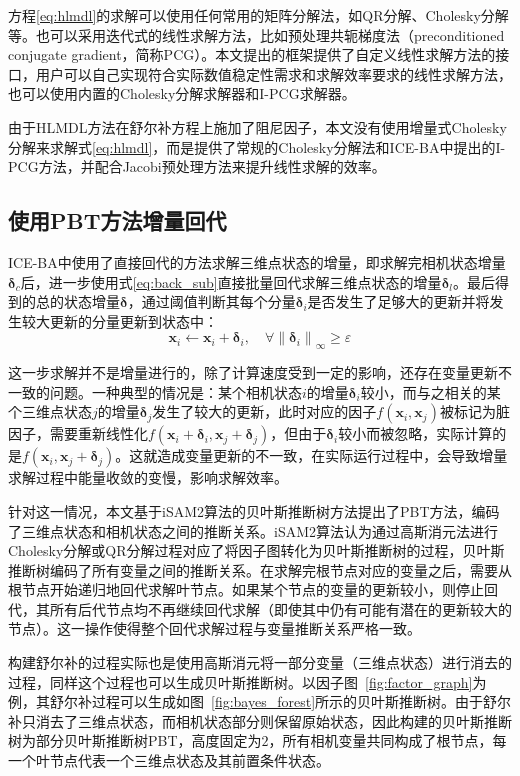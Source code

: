 方程\eqref{eq:hlmdl}的求解可以使用任何常用的矩阵分解法，如QR分解、Cholesky分解等。也可以采用迭代式的线性求解方法，比如预处理共轭梯度法（preconditioned conjugate gradient，简称PCG）。本文提出的框架提供了自定义线性求解方法的接口，用户可以自己实现符合实际数值稳定性需求和求解效率要求的线性求解方法，也可以使用内置的Cholesky分解求解器和I-PCG求解器。

由于HLMDL方法在舒尔补方程上施加了阻尼因子，本文没有使用增量式Cholesky分解\citep{polok2013incremental}来求解式\eqref{eq:hlmdl}，而是提供了常规的Cholesky分解法和ICE-BA中提出的I-PCG方法，并配合Jacobi预处理方法\citep{jeong2012pushing}来提升线性求解的效率。

\subsection{使用PBT方法增量回代}

ICE-BA中使用了直接回代的方法求解三维点状态的增量，即求解完相机状态增量$\bm{\delta}_c$后，进一步使用式\eqref{eq:back_sub}直接批量回代求解三维点状态的增量$\bm{\delta}_l$。最后得到的总的状态增量$\bm{\delta}$，通过阈值判断其每个分量$\bm{\delta}_i$是否发生了足够大的更新并将发生较大更新的分量更新到状态中：
\begin{equation}
    \bm{x}_i \leftarrow \bm{x}_i + \bm{\delta}_i, \quad
    \forall \left\|\bm{\delta}_i\right\|_{\infty} \geq \varepsilon
\end{equation}

这一步求解并不是增量进行的，除了计算速度受到一定的影响，还存在变量更新不一致的问题。一种典型的情况是：某个相机状态$i$的增量$\bm{\delta}_i$较小，而与之相关的某个三维点状态$j$的增量$\bm{\delta}_{j}$发生了较大的更新，此时对应的因子$f(\bm{x}_i,\bm{x}_j)$被标记为脏因子，需要重新线性化$f(\bm{x}_i+\bm{\delta}_i,\bm{x}_j+\bm{\delta}_j)$，但由于$\bm{\delta}_i$较小而被忽略，实际计算的是$f(\bm{x}_i,\bm{x}_j+\bm{\delta}_j)$。这就造成变量更新的不一致，在实际运行过程中，会导致增量求解过程中能量收敛的变慢，影响求解效率。

针对这一情况，本文基于iSAM2算法的贝叶斯推断树方法提出了PBT方法，编码了三维点状态和相机状态之间的推断关系。iSAM2算法认为通过高斯消元法进行Cholesky分解或QR分解过程对应了将因子图转化为贝叶斯推断树的过程，贝叶斯推断树编码了所有变量之间的推断关系。在求解完根节点对应的变量之后，需要从根节点开始递归地回代求解叶节点。如果某个节点的变量的更新较小，则停止回代，其所有后代节点均不再继续回代求解（即使其中仍有可能有潜在的更新较大的节点）。这一操作使得整个回代求解过程与变量推断关系严格一致。

构建舒尔补的过程实际也是使用高斯消元将一部分变量（三维点状态）进行消去的过程，同样这个过程也可以生成贝叶斯推断树。以因子图~\ref{fig:factor_graph}为例，其舒尔补过程可以生成如图~\ref{fig:bayes_forest}所示的贝叶斯推断树。由于舒尔补只消去了三维点状态，而相机状态部分则保留原始状态，因此构建的贝叶斯推断树为部分贝叶斯推断树PBT，高度固定为$2$，所有相机变量共同构成了根节点，每一个叶节点代表一个三维点状态及其前置条件状态。

